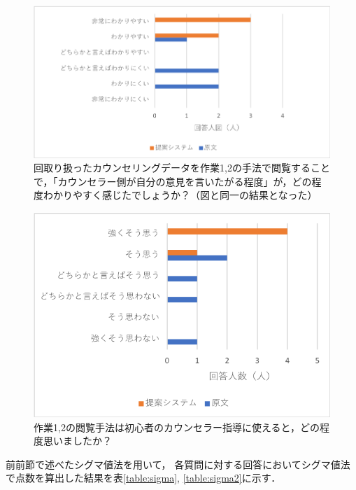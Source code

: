 \documentclass[shuuron]{kuee}
\begin{document}
\begin{figure}
  \begin{center}
    \includegraphics[width=\linewidth]{q1.png}
  \end{center}
  \caption{回取り扱ったカウンセリングデータを作業1,2の手法で閲覧することで，「カウンセラー側が自分の意見を言いたがる程度」が，どの程度わかりやすく感じたでしょうか？（図\label{fig:q1}と同一の結果となった）}
  \label{fig:q1}
\end{figure}

\begin{figure}
  \begin{center}
    \includegraphics[width=\linewidth]{q3.png}
  \end{center}
  \caption{作業1,2の閲覧手法は初心者のカウンセラー指導に使えると，どの程度思いましたか？}
  \label{fig:q3}
\end{figure}

前前節で述べたシグマ値法を用いて，
各質問に対する回答においてシグマ値法で点数を算出した結果を表\ref{table:sigma}, \ref{table:sigma2}に示す．
\end{document}

